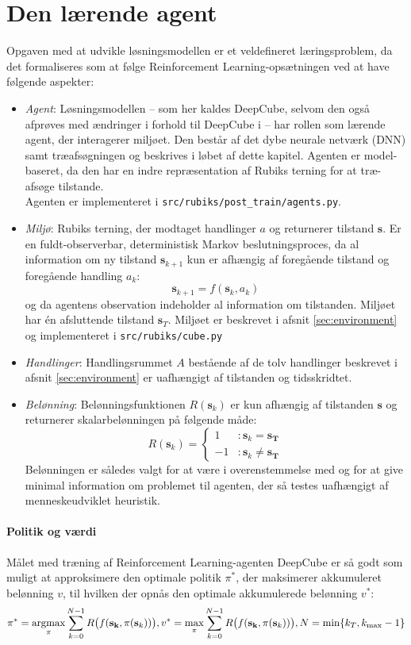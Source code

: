 \documentclass[../main.tex]{subfiles}
\begin{document}
\section{Den lærende agent}
Opgaven med at udvikle løsningsmodellen er et veldefineret læringsproblem, da det formaliseres som at følge Reinforcement Learning-opsætningen ved at have følgende aspekter:
\begin{itemize}
	\item \textit{Agent}: Løsningsmodellen -- som her kaldes DeepCube, selvom den også afprøves med ændringer i forhold til DeepCube i \cite{HumansBeGone} -- har rollen som lærende agent, der interagerer miljøet. Den består af det dybe neurale netværk (DNN) samt træafsøgningen og beskrives i løbet af dette kapitel. Agenten er model-baseret, da den har en indre repræsentation af Rubiks terning for at træ-afsøge tilstande.  \\
	Agenten er implementeret i  \texttt{src/rubiks/post\_train/agents.py}.
	\item \textit{Miljø}: Rubiks terning, der modtaget handlinger \(a\) og returnerer tilstand \(\mathbf s\). Er en fuldt-observerbar, deterministisk Markov beslutningsproces, da al information om ny tilstand \(\mathbf s_{k+1}\) kun er afhængig af foregående tilstand og foregående handling \(a_k\):
	\[
		\mathbf s _ {k+1} = f(\mathbf s _k, a_k)
	\] 
	og da agentens observation indeholder al information om tilstanden. Miljøet har én afsluttende tilstand \(\mathbf s_T\). Miljøet er  beskrevet i afsnit \ref{sec:environment} og implementeret i \texttt{src/rubiks/cube.py} 
	\item  \textit{Handlinger}: Handlingsrummet \(A\) bestående af de tolv handlinger beskrevet i afsnit \ref{sec:environment} er uafhængigt af tilstanden og tidsskridtet.
	\item \textit{Belønning}: Belønningsfunktionen \( R(\mathbf s_k)\) er kun afhængig af tilstanden \(\mathbf s\) og returnerer skalarbelønningen på følgende måde:
	\[
		R (\mathbf s_k) = 
		\begin{cases}
			1  &: \mathbf s_k = \mathbf{s_T}\\
			-1 &: \mathbf s_k \neq \mathbf{s_T}
		\end{cases}
	\] 
	Belønningen er således valgt for at være i overenstemmelse med \cite{HumansBeGone} og for at give minimal information om problemet til agenten, der så testes uafhængigt af menneskeudviklet heuristik.
\end{itemize}
\paragraph{Politik og værdi} Målet med træning af Reinforcement Learning-agenten DeepCube er så godt som muligt at approksimere den optimale politik \(\pi^*\), der maksimerer akkumuleret belønning \(v\), til hvilken der opnås den optimale akkumulerede belønning \(v^*\):
\begin{equation}\label{eq:maxprob}
\pi^* = \operatorname*{argmax}_{\pi}\sum_{k=0}^{N-1} R\big(f(\mathbf{s_k},\pi(\mathbf s_k))\big),
v^* = \operatorname*{max}_\pi\sum_{k=0}^{N-1} R\big(f(\mathbf{s_k},\pi(\mathbf s_k))\big),
N = \operatorname{min}\{k_T, k_{\text{max}}-1\}
\end{equation}
\end{document}
